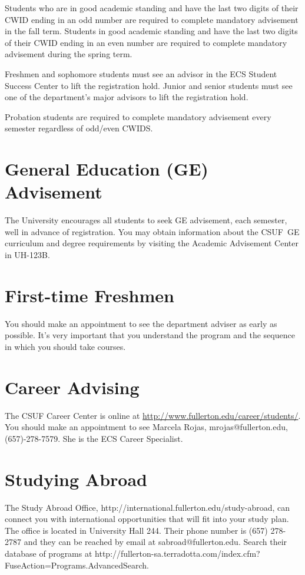 \documentclass{book}
\newcommand{\CampusName}{CSUF}
\begin{document}
Students who are in good academic standing and have the last two
digits of their CWID ending in an odd number are required to complete
mandatory advisement in the fall term. Students in good academic
standing and have the last two digits of their CWID ending in an even
number are required to complete mandatory advisement during the spring
term.

Freshmen and sophomore students must see an advisor in the ECS Student
Success Center to lift the registration hold. Junior and senior
students must see one of the department's major advisors to lift the
registration hold.

Probation students are required to complete mandatory advisement every
semester regardless of odd/even CWIDS.

\section{General Education (GE) Advisement}
 
The University encourages all students to seek GE advisement, each
semester, well in advance of registration.  You may obtain information
about the \CampusName~GE curriculum and degree requirements by
visiting the Academic Advisement Center in UH-123B.

\section{First-time Freshmen}
You should make an appointment to see the department adviser as early
as possible. It's very important that you understand the program and
the sequence in which you should take courses.


\section{Career Advising}
The CSUF Career Center is online at
\url{http://www.fullerton.edu/career/students/}. You should make an
appointment to see Marcela Rojas, mrojas@fullerton.edu,
(657)-278-7579. She is the ECS Career Specialist.

\section{Studying Abroad}
The Study Abroad Office,
http://international.fullerton.edu/study-abroad, can connect you with
international opportunities that will fit into your study plan. The
office is located in University Hall 244. Their phone number is (657)
278-2787 and they can be reached by email at
sabroad@fullerton.edu. Search their database of programs at
http://fullerton-sa.terradotta.com/index.cfm?FuseAction=Programs.AdvancedSearch.
\end{document}
